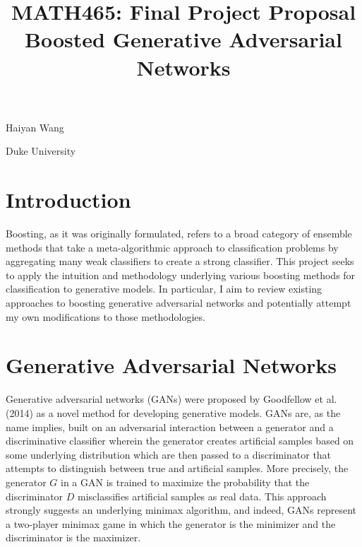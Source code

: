 \documentclass[12pt, reqno]{amsart}
\title{MATH465: Final Project Proposal \\ Boosted Generative Adversarial Networks}
\newcommand{\NAME}{Haiyan Wang}
\newcommand{\UNIVERSITY}{Duke University}
\begin{document}
\maketitle
\vspace*{-0.25in}
\centerline{\NAME}
\centerline{\UNIVERSITY}
\vspace*{0.15in}


\section*{Introduction}

Boosting, as it was originally formulated, refers to a broad category of ensemble methods that take a meta-algorithmic approach to classification problems by aggregating many weak classifiers to create a strong classifier. This project seeks to apply the intuition and methodology underlying various boosting methods for classification to generative models. In particular, I aim to review existing approaches to boosting generative adversarial networks and potentially attempt my own modifications to those methodologies. \\

\section*{Generative Adversarial Networks}

Generative adversarial networks (GANs) were proposed by Goodfellow et al. (2014) as a novel method for developing generative models. GANs are, as the name implies, built on an adversarial interaction between a generator and a discriminative classifier wherein the generator creates artificial samples based on some underlying distribution which are then passed to a discriminator that attempts to distinguish between true and artificial samples. More precisely, the generator $G$ in a GAN is trained to maximize the probability that the discriminator $D$ misclassifies artificial samples as real data. This approach strongly suggests an underlying minimax algorithm, and indeed, GANs represent a two-player minimax game in which the generator is the minimizer and the discriminator is the maximizer. \\
\end{document}
